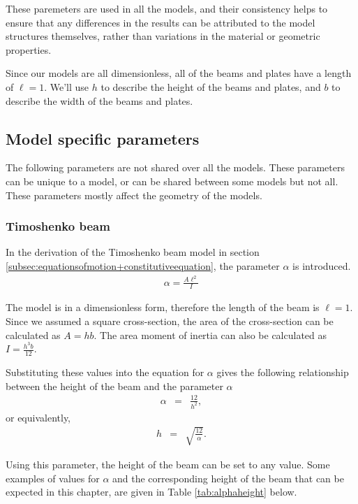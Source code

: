 \documentclass[../../main.tex]{subfiles}
\begin{document}
These paremeters are used in all the models, and their consistency helps to ensure that any differences in the results can be attributed to the model structures themselves, rather than variations in the material or geometric properties.

Since our models are all dimensionless, all of the beams and plates have a length of $\ell = 1$. We'll use $h$ to describe the height of the beams and plates, and $b$ to describe the width of the beams and plates.

\subsection{Model specific parameters}
The following parameters are not shared over all the models. These parameters can be unique to a model, or can be shared between some models but not all. These parameters mostly affect the geometry of the models.

\subsubsection{Timoshenko beam}
In the derivation of the Timoshenko beam model in section \ref{subsec:equationsofmotion+constitutiveequation}, the parameter $\alpha$ is introduced.
\begin{eqnarray*}
	\alpha = \frac{A\ell^2}{I}
\end{eqnarray*}

The model is in a dimensionless form, therefore the length of the beam is $\ell = 1$. Since we assumed a square cross-section, the area of the cross-section can be calculated as $\displaystyle A = hb$. The area moment of inertia can also be calculated as $\displaystyle I = \frac{h^3b}{12}$.

Substituting these values into the equation for $\alpha$ gives the following relationship between the height of the beam and the parameter $\alpha$
\begin{eqnarray*}
	\alpha & = & \frac{12}{h^2},
\end{eqnarray*}
or equivalently,
\begin{eqnarray*}
	h & = & \sqrt{\frac{12}{\alpha}}.
\end{eqnarray*}

Using this parameter, the height of the beam can be set to any value. Some examples of values for $\alpha$ and the corresponding height of the beam that can be expected in this chapter, are given in Table \ref{tab:alphaheight} below.
\end{document}
